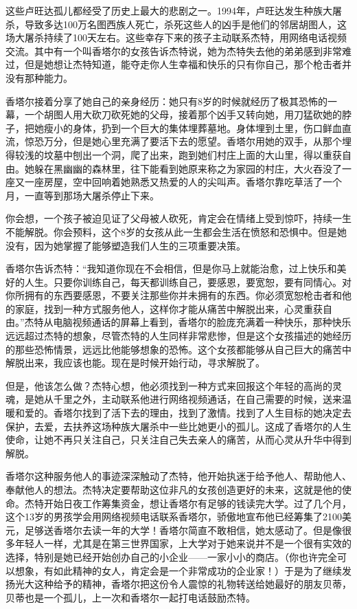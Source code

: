 这些卢旺达孤儿都经受了历史上最大的悲剧之一。1994年，卢旺达发生种族大屠杀，导致多达100万名图西族人死亡，杀死这些人的凶手是他们的邻居胡图人，这场大屠杀持续了100天左右。这些幸存下来的孩子主动联系杰特，用网络电话视频交流。其中有一个叫香塔尔的女孩告诉杰特说，她为杰特失去他的弟弟感到非常难过，但是她想让杰特知道，能夺走你人生幸福和快乐的只有你自己，那个枪击者并没有那种能力。

香塔尔接着分享了她自己的亲身经历：她只有8岁的时候就经历了极其恐怖的一幕，一个胡图人用大砍刀砍死她的父母，接着那个凶手又转向她，用刀猛砍她的脖子，把她瘦小的身体，扔到一个巨大的集体埋葬墓地。身体埋到土里，伤口鲜血直流，惊恐万分，但是她心里充满了要活下去的愿望。香塔尔用她的双手，从那个埋得较浅的坟墓中刨出一个洞，爬了出来，跑到她们村庄上面的大山里，得以重获自由。她躲在黑幽幽的森林里，往下能看到她原来称之为家园的村庄，大火吞没了一座又一座房屋，空中回响着她熟悉又热爱的人的尖叫声。香塔尔靠吃草活了一个月，一直等到那场大屠杀停止下来。

你会想，一个孩子被迫见证了父母被人砍死，肯定会在情绪上受到惊吓，持续一生不能解脱。你会预料，这个8岁的女孩从此一生都会生活在愤怒和恐惧中。但是她没有，因为她掌握了能够塑造我们人生的三项重要决策。

香塔尔告诉杰特：“我知道你现在不会相信，但是你马上就能治愈，过上快乐和美好的人生。只要你训练自己，每天都训练自己，要感恩，要宽恕，要有同情心。对你所拥有的东西要感恩，不要关注那些你并未拥有的东西。你必须宽恕枪击者和他的家庭，找到一种方式服务他人，这样你才能从痛苦中解脱出来，心灵重获自由。”杰特从电脑视频通话的屏幕上看到，香塔尔的脸庞充满着一种快乐，那种快乐远远超过杰特的想象，尽管杰特的人生同样非常悲惨，但是这个女孩描述的她经历的那些恐怖情景，远远比他能够想象的恐怖。这个女孩都能够从自己巨大的痛苦中解脱出来，我应该也能。现在是时候开始行动，寻求解脱了。

但是，他该怎么做？杰特心想，他必须找到一种方式来回报这个年轻的高尚的灵魂，是她从千里之外，主动联系他进行网络视频通话，在自己需要的时候，送来温暖和爱的。香塔尔找到了活下去的理由，找到了激情。找到了人生目标的她决定去保护，去爱，去扶养这场种族大屠杀中一些比她更小的孤儿。这成了香塔尔的人生使命，让她不再只关注自己，只关注自己失去亲人的痛苦，从而心灵从升华中得到解脱。

香塔尔这种服务他人的事迹深深触动了杰特，他开始执迷于给予他人、帮助他人、奉献他人的想法。杰特决定要帮助这位非凡的女孩创造更好的未来，这就是他的使命。杰特开始日夜工作筹集资金，想让香塔尔有足够的钱读完大学。过了几个月，这个13岁的男孩学会用网络视频电话联系香塔尔，骄傲地宣布他已经筹集了2100美元，足够送香塔尔去读一年的大学！香塔尔简直不敢相信，她太感动了。但是像很多年轻人一样，尤其是在第三世界国家，上大学对于她来说并不是一个很有实效的选择，特别是她已经开始创办自己的小企业——一家小小的商店。（你也许完全可以想象，有如此精神的女人，肯定会是一个非常成功的企业家！）于是为了继续发扬光大这种给予的精神，香塔尔把这份令人震惊的礼物转送给她最好的朋友贝蒂，贝蒂也是一个孤儿，上一次和香塔尔一起打电话鼓励杰特。

